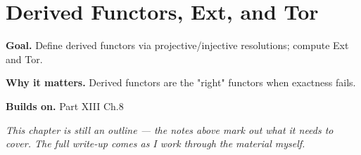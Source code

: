 \chapter{Derived Functors, Ext, and Tor}
\label{ch:13-category-theory-and-universal-structures-09}

\begin{chapterintro}
\textbf{Goal.} Define derived functors via projective/injective resolutions; compute Ext and Tor.

\textbf{Why it matters.} Derived functors are the "right" functors when exactness fails.

\textbf{Builds on.} Part XIII Ch.8
\end{chapterintro}

\textit{This chapter is still an outline --- the notes above mark out what it needs to cover. The full write-up comes as I work through the material myself.}
